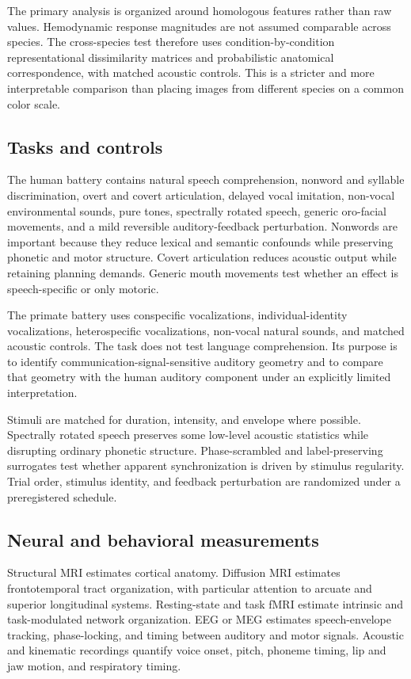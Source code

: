 \documentclass[conference]{IEEEtran}
\begin{document}
The primary analysis is organized around homologous features rather than raw values. Hemodynamic response magnitudes are not assumed comparable across species. The cross-species test therefore uses condition-by-condition representational dissimilarity matrices and probabilistic anatomical correspondence, with matched acoustic controls. This is a stricter and more interpretable comparison than placing images from different species on a common color scale.

\subsection{Tasks and controls}

The human battery contains natural speech comprehension, nonword and syllable discrimination, overt and covert articulation, delayed vocal imitation, non-vocal environmental sounds, pure tones, spectrally rotated speech, generic oro-facial movements, and a mild reversible auditory-feedback perturbation. Nonwords are important because they reduce lexical and semantic confounds while preserving phonetic and motor structure. Covert articulation reduces acoustic output while retaining planning demands. Generic mouth movements test whether an effect is speech-specific or only motoric.

The primate battery uses conspecific vocalizations, individual-identity vocalizations, heterospecific vocalizations, non-vocal natural sounds, and matched acoustic controls. The task does not test language comprehension. Its purpose is to identify communication-signal-sensitive auditory geometry and to compare that geometry with the human auditory component under an explicitly limited interpretation.

Stimuli are matched for duration, intensity, and envelope where possible. Spectrally rotated speech preserves some low-level acoustic statistics while disrupting ordinary phonetic structure. Phase-scrambled and label-preserving surrogates test whether apparent synchronization is driven by stimulus regularity. Trial order, stimulus identity, and feedback perturbation are randomized under a preregistered schedule.

\subsection{Neural and behavioral measurements}

Structural MRI estimates cortical anatomy. Diffusion MRI estimates frontotemporal tract organization, with particular attention to arcuate and superior longitudinal systems. Resting-state and task fMRI estimate intrinsic and task-modulated network organization. EEG or MEG estimates speech-envelope tracking, phase-locking, and timing between auditory and motor signals. Acoustic and kinematic recordings quantify voice onset, pitch, phoneme timing, lip and jaw motion, and respiratory timing.
\end{document}
